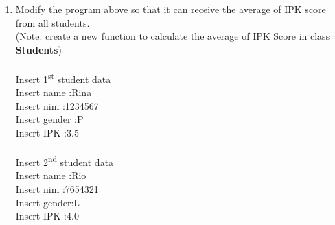 \documentclass[12pt,titlepage]{article}
\begin{document}
\begin{enumerate}
\begin{verbatim}
                StudentData[] studentDatas = new StudentData[limit];
                for (int i = 0; i < limit; i++) {
                    studentDatas[i] = new StudentData();
                    System.out.printf("Insert %d student data\n", i+1);
                    System.out.print("Insert name: ");
                    studentDatas[i].name = input.next();
                    input.nextLine();
                    System.out.print("Insert NIM: ");
                    studentDatas[i].NIM = input.next();
                    input.nextLine();
                    System.out.print("Insert gender: ");
                    studentDatas[i].gender = input.next();
                    input.nextLine();
                    System.out.print("Insert IPK: ");
                    studentDatas[i].IPK = input.nextDouble();
                    System.out.println();
                }
                for (int i = 0; i < limit; i++) {
                    System.out.printf("%d student data\n", i+1);
                    System.out.printf("name: %s\n", studentDatas[i].name);
                    System.out.printf("nim: %s\n", studentDatas[i].NIM);
                    System.out.printf("gender: %s\n", studentDatas[i].gender);
                    System.out.printf("IPK: %.1f\n", studentDatas[i].IPK);
                    System.out.println();
                }
                input.close();
            }
        }
    \end{verbatim}
    \item Modify the program above so that it can receive the average of IPK score from all students.
    \mbox{}\\ (Note: create a new function to calculate the average of IPK Score in class \textbf{Students})
    \mbox{}\\ 
    \mbox{}\\ Insert 1\textsuperscript{st} student data
    \mbox{}\\ Insert name :Rina
    \mbox{}\\ Insert nim :1234567
    \mbox{}\\ Insert gender :P
    \mbox{}\\ Insert IPK :3.5
    \mbox{}\\
    \mbox{}\\ Insert 2\textsuperscript{nd} student data
    \mbox{}\\ Insert name :Rio
    \mbox{}\\ Insert nim :7654321
    \mbox{}\\ Insert gender:L
    \mbox{}\\ Insert IPK :4.0

\end{enumerate}
\end{document}
